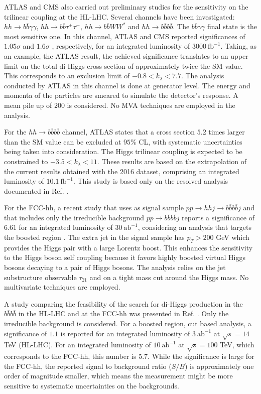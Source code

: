 ATLAS and CMS also carried out preliminary studies for the sensitivity on the trilinear coupling at the HL-LHC. Several channels have been investigated: $hh\rightarrow  b\overline{b}\gamma\gamma$, $hh\rightarrow b\overline{b} \tau^+ \tau^-$, $hh\rightarrow b\overline{b} WW^*$ and $hh\rightarrow  b\overline{b}b\overline{b}$. The $b\overline{b}\gamma\gamma$ final state is the most sensitive one. In this channel, ATLAS and CMS reported significances of $1.05\sigma$ \cite{ATLAShh2bbAA_HL} and $1.6\sigma$ \cite{CMShh2bbAA_HL}, respectively, for an integrated luminosity of $3000~\text{fb}^{-1}$. Taking, as an example, the ATLAS result, the achieved significance translates to an upper limit on the total di-Higgs cross section of approximately twice the SM value. This corresponds to an exclusion limit of $-0.8<k_{\lambda}<7.7$. The analysis conducted by ATLAS in this channel is done at generator level. The energy and momenta of the particles are smeared to simulate the detector's response. A mean pile up of $200$ is considered. No MVA techniques are employed in the analysis. 

For the $hh\rightarrow  b\overline{b}b\overline{b}$ channel, ATLAS states that a cross section $5.2$ times larger than the SM value can be excluded at $95\%$ CL, with systematic uncertainties being taken into consideration. The Higgs trilinear coupling is expected to be constrained to $-3.5<k_{\lambda}<11$. These results are based on the extrapolation of the current results obtained with the 2016 dataset, comprising an integrated luminosity of $10.1~\text{fb}^{-1}$. This study is based only on the resolved analysis documented in Ref. \cite{hh2bbbbATLAS}.

For the FCC-hh, a recent study that uses as signal sample $pp\rightarrow hhj\rightarrow b\overline{b}b\overline{b}j$ and that includes only the irreducible background $pp\rightarrow b\overline{b}b\overline{b}j$ reports a significance of $6.61$ for an integrated luminosity of $30~\text{ab}^{-1}$, considering an analysis that targets the boosted region \cite{hh+jet_100TeV}. The extra jet in the signal sample has $p_T>200$ GeV which provides the Higgs pair with a large Lorentz boost. This enhances the sensitivity to the Higgs boson self coupling because it favors highly boosted virtual Higgs bosons decaying to a pair of Higgs bosons. The analysis relies on the jet substructure observable $\tau_{21}$ and on a tight mass cut around the Higgs mass. No multivariate techniques are employed. 

A study comparing the feasibility of the search for di-Higgs production in the $b\overline{b}b\overline{b}$ in the HL-LHC and at the FCC-hh was presented in Ref. \cite{hhFeasibility1_100TeV}. Only the irreducible background is considered. For a boosted region, cut based analysis, a significance of $1.1$ is reported for an integrated luminosity of $3~\text{ab}^{-1}$ at $\sqrt{s}=14$ TeV (HL-LHC). For an integrated luminosity of $10~\text{ab}^{-1}$ at $\sqrt{s}=100$ TeV, which corresponds to the FCC-hh, this number is $5.7$. While the significance is large for the FCC-hh, the reported signal to background ratio ($S/B$) is approximately one order of magnitude smaller, which means the measurement might be more sensitive to systematic uncertainties on the backgrounds. 

